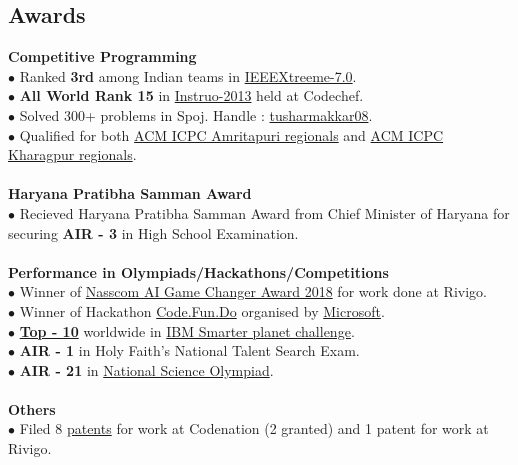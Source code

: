 \documentclass[margin,line]{resume}
\begin{document}
\begin{resume}
  \section{\mysidestyle \bf Awards}
  {\bf Competitive Programming } 
 \\$\bullet$ Ranked {\bfseries 3rd} among Indian teams in \href{http://www.ieee.org/membership_services/membership/students/competitions/xtreme/index.html}{IEEEXtreeme-7.0}.
    \\$\bullet$ {\bfseries All World Rank 15} in \href{http://www.codechef.com/rankings/INST2013/}{Instruo-2013} held at Codechef.
\\$\bullet$ Solved 300+ problems in Spoj. Handle :  \href{http://www.spoj.com/users/tusharmakkar08/}{tusharmakkar08}.
    \\$\bullet$ Qualified for both \href{icpc.amrita.ac.in}{ACM ICPC Amritapuri regionals} and \href{http://acm.iitkgp.ac.in/}{ACM ICPC Kharagpur regionals}.
\\\\    {\bf Haryana Pratibha Samman Award}
     \\$\bullet$ Recieved Haryana Pratibha Samman Award from Chief Minister of Haryana for securing {\bfseries AIR - 3} in High School Examination.
\\\\ {\bf Performance in Olympiads/Hackathons/Competitions}
    \\$\bullet$ Winner of \href{https://www.linkedin.com/feed/update/urn:li:activity:6425565017244037120/}{Nasscom AI Game Changer Award 2018} for work done at Rivigo.
     \\$\bullet$ Winner of Hackathon \href{https://www.acadaccelerator.com/Home/Events}{Code.Fun.Do} organised by \href{http://www.microsoft.com/en-in/msidc/default.aspx}{Microsoft}.
    \\$\bullet$ \href{https://timesofindia.indiatimes.com/city/mangaluru/Mangalore-students-take-eco-literacy-online/articleshow/24455031.cms}{\bfseries{Top - 10}} worldwide in \href{http://www.ibm.com/ibm/history/ibm100/us/en/icons/smarterplanet/}{IBM Smarter planet challenge}.
\\$\bullet$ {\bfseries AIR - 1} in Holy Faith's National Talent Search Exam.
    \\$\bullet$ {\bfseries AIR - 21} in \href{http://www.sofworld.org/nso}{National Science Olympiad}.
    \\\\ {\bf Others}
\\$\bullet$ Filed 8 \href{https://patents.google.com/?inventor=Tushar+Makkar}{patents} for work at Codenation (2 granted) and 1 patent for work at Rivigo.


\end{resume}
\end{document}
